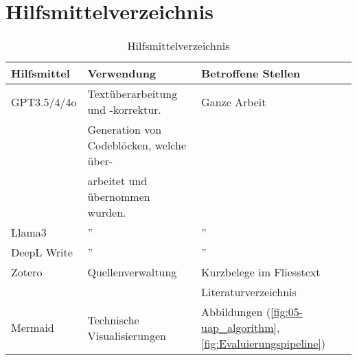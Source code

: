 \section*{Hilfsmittelverzeichnis}

\begin{table}[ht!]
\centering
\begin{tabular}{l|l|l}
\hline
\textbf{Hilfsmittel} & \textbf{Verwendung} & \textbf{Betroffene Stellen} \\ 
\hline
GPT3.5/4/4o & Textüberarbeitung und -korrektur. & Ganze Arbeit \\
 & Generation von Codeblöcken, welche über- & \\
 & arbeitet und übernommen wurden. & \\
\hline
Llama3 & '' & '' \\ 
\hline
DeepL Write & '' & '' \\ 
\hline
Zotero & Quellenverwaltung & Kurzbelege im Fliesstext \\ 
& & Literaturverzeichnis \\
\hline
Mermaid & Technische Visualisierungen &  Abbildungen (\ref{fig:05-uap_algorithm}, \ref{fig:Evaluierungspipeline})\\
\bottomrule
\end{tabular}
\caption{Hilfsmittelverzeichnis}
\label{tab:hilfmittelverzeichnis}
\end{table}


